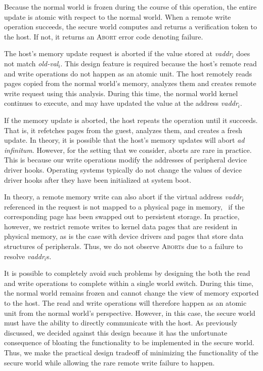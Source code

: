 Because the normal world is frozen during the course of this operation, the
entire update is atomic with respect to the normal world. When a remote write
operation succeeds, the secure world computes and returns a verification token
to the host. If not, it returns an \textsc{Abort} error code denoting failure.

The host's memory update request is aborted if the value stored at
\textit{vaddr}$_i$ does not match \textit{old-val}$_i$.  This design feature is
required because the host's remote read and write operations do not happen as
an atomic unit. The host remotely reads pages copied from the normal world's
memory, analyzes them and creates remote write request using this analysis.
During this time, the normal world kernel continues to execute, and may have
updated the value at the address \textit{vaddr}$_i$.

If the memory update is aborted, the host repeats the operation until it
succeeds. That is, it refetches pages from the guest, analyzes them, and
creates a fresh update. In theory, it is possible that the host's memory
updates will abort \textit{ad infinitum}. However, for the setting that we
consider, aborts are rare in practice. This is because our
write operations modify the addresses of peripheral device driver hooks.
Operating systems typically do not change the values of device driver hooks
after they have been initialized at system boot. 

In theory, a remote memory write can also abort if the virtual address
\textit{vaddr}$_i$ referenced in the request is not mapped to a physical page
in memory, \ie~if the corresponding page has been swapped out to persistent
storage. In practice, however, we restrict remote writes to kernel data pages
that are resident in physical memory, as is the case with device drivers and
pages that store data structures of peripherals. Thus, we do not observe
\textsc{Abort}s due to a failure to resolve \textit{vaddr}$_i$s.

It is possible to completely avoid such problems by designing the both the read
and write operations to complete within a single world switch. During this
time, the normal world remains frozen and cannot change the view of memory
exported to the host. The read and write operations will therefore happen as an
atomic unit from the normal world's perspective. However, in this case, the
secure world must have the ability to directly communicate with the host. As
previously discussed, we decided against this design because it has the
unfortunate consequence of bloating the functionality to be implemented in the
secure world.  Thus, we make the practical design tradeoff of minimizing the
functionality of the secure world while allowing the rare remote write failure
to happen.

